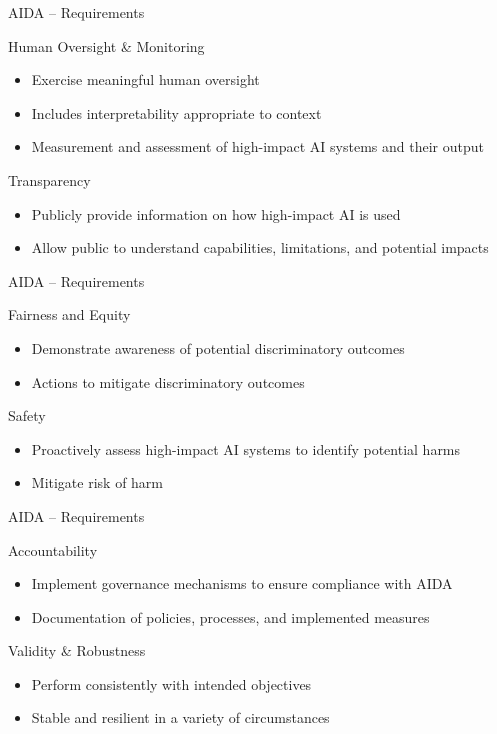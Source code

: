 \documentclass[ignorenonframetext,xcolor=x11names]{beamer}
\begin{document}
\begin{frame}{AIDA -- Requirements}
\begin{block}{Human Oversight \& Monitoring}
\begin{itemize}
   \item Exercise meaningful human oversight
   \item Includes interpretability appropriate to context
   \item Measurement and assessment of high-impact AI systems and their output
\end{itemize}
\end{block}

\begin{block}{Transparency}
\begin{itemize}
   \item Publicly provide information on how high-impact AI is used
   \item Allow public to understand capabilities, limitations, and potential impacts
\end{itemize}
\end{block}
\end{frame}

\begin{frame}{AIDA -- Requirements}
\begin{block}{Fairness and Equity}
\begin{itemize}
   \item Demonstrate awareness of potential discriminatory outcomes
   \item Actions to mitigate discriminatory outcomes
\end{itemize}
\end{block}

\begin{block}{Safety}
\begin{itemize}
  \item Proactively assess high-impact AI systems to identify potential harms
  \item Mitigate risk of harm
\end{itemize}
\end{block}
\end{frame}

\begin{frame}{AIDA -- Requirements}
\begin{block}{Accountability}
\begin{itemize}
  \item Implement governance mechanisms to ensure compliance with AIDA
  \item Documentation of policies, processes, and implemented measures
\end{itemize}
\end{block}

\begin{block}{Validity \& Robustness}
\begin{itemize}
  \item Perform consistently with intended objectives
  \item Stable and resilient in a variety of circumstances
\end{itemize}
\end{block}
\end{frame}
\end{document}
